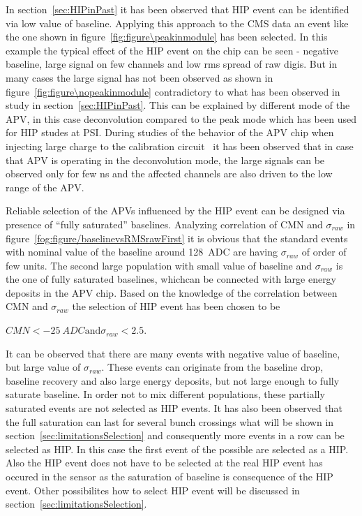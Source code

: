 In section~\ref{sec:HIPinPast} it has been observed that HIP event can be identified via low value of baseline. Applying this approach to the CMS data an event like the one shown in figure~\ref{fig:figure\peakinmodule} has been selected. In this example the typical effect of the HIP event on the chip can be seen - negative baseline, large signal on few channels and low rms spread of raw digis. But in many cases the large signal has not been observed as shown in figure~\ref{fig:figure\nopeakinmodule} contradictory to what has been observed in study in section~\ref{sec:HIPinPast}. This can be explained by different mode of the APV, in this case deconvolution compared to the peak mode which has been used for HIP studes at PSI. During studies of the behavior of the APV chip when injecting large charge to the calibration circuit~\cite{Bainbridge:2002bda} it has been observed that in case that APV is operating in the deconvolution mode, the large signals can be observed only for few ns and the affected channels are also driven to the low range of the APV. 


Reliable selection of the APVs influenced by the HIP event can be designed via presence of ``fully saturated'' baselines. Analyzing correlation of CMN and $\sigma_{raw}$ in figure~\ref{fog:figure/baselinevsRMSrawFirst} it is obvious that the standard events with nominal value of the baseline around 128~ADC are having $\sigma_{raw}$ of order of few units. The second large population with small value of baseline and $\sigma_{raw}$ is the one of fully saturated baselines, whichcan be connected with large energy deposits in the APV chip. Based on the knowledge of the correlation between CMN and $\sigma_{raw}$ the selection of HIP event has been chosen to be 

{
$CMN<-25~ADC \mathrm{and} \sigma_{raw}<2.5$.
}


It can be observed that there are many events with negative value of baseline, but large value of $\sigma_{raw}$. These events can originate from the baseline drop, baseline recovery and also large energy deposits, but not large enough to fully saturate baseline. In order not to mix different populations, these partially saturated events are not selected as HIP events. It has also been observed that the full saturation can last for several bunch crossings what will be shown in section~\ref{sec:limitationsSelection} and consequently more events in a row can be selected as HIP. In this case the first event of the possible are selected as a HIP. Also the HIP event does not have to be selected at the real HIP event has occured in the sensor as the saturation of baseline is consequence of the HIP event. Other possibilites how to select HIP event will be discussed in section~\ref{sec:limitationsSelection}.

